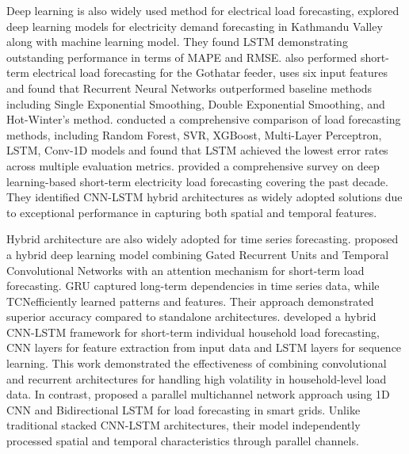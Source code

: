 \documentclass[oneside, 12pt]{book}
\numberwithin{equation}{chapter}
\begin{document}
Deep learning is also widely used method for electrical load forecasting, \parencite{chapagain2021short} explored deep learning models for electricity demand forecasting in Kathmandu Valley along with machine learning model. They found LSTM demonstrating outstanding performance in terms of MAPE and RMSE. \parencite{acharya2021stlf} also performed short-term electrical load forecasting for the Gothatar feeder, uses six input features and found that Recurrent Neural Networks outperformed baseline methods including Single Exponential Smoothing, Double Exponential Smoothing, and Hot-Winter's method. \parencite{cordeiro2023load} conducted a comprehensive comparison of load forecasting methods, including Random Forest, SVR, XGBoost, Multi-Layer Perceptron, LSTM, Conv-1D models and found that LSTM achieved the lowest error rates across multiple evaluation metrics. \parencite{dong2024decade} provided a comprehensive survey on deep learning-based short-term electricity load forecasting covering the past decade. They identified CNN-LSTM hybrid architectures as widely adopted solutions due to exceptional performance in capturing both spatial and temporal features. 

Hybrid architecture are also widely adopted for time series forecasting. \parencite{wen2024gru}  proposed a hybrid deep learning model combining Gated Recurrent Units and Temporal Convolutional Networks with an attention mechanism for short-term load forecasting. GRU captured long-term dependencies in time series data, while TCNefficiently learned patterns and features. Their approach demonstrated superior accuracy compared to standalone architectures. \parencite{alhussein2020cnn} developed a hybrid CNN-LSTM framework for short-term individual household load forecasting, CNN layers for feature extraction from input data and LSTM layers for sequence
learning. This work demonstrated the effectiveness of combining convolutional and
recurrent architectures for handling high volatility in household-level load data. In
contrast, \parencite{hasanat2024parallel} proposed a parallel multichannel network approach using 1D CNN and Bidirectional LSTM for load forecasting in smart grids. Unlike
traditional stacked CNN-LSTM architectures, their model independently processed
spatial and temporal characteristics through parallel channels.
\end{document}
